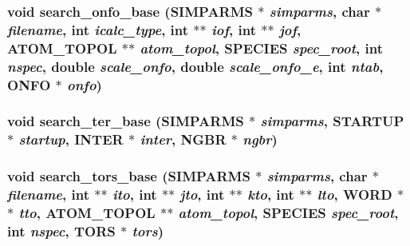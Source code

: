 \subsubsection{\setlength{\rightskip}{0pt plus 5cm}void search\_\-onfo\_\-base ({\bf SIMPARMS} $\ast$ {\em simparms}, char $\ast$ {\em filename}, int {\em icalc\_\-type}, int $\ast$$\ast$ {\em iof}, int $\ast$$\ast$ {\em jof}, {\bf ATOM\_\-TOPOL} $\ast$$\ast$ {\em atom\_\-topol}, {\bf SPECIES} {\em spec\_\-root}, int {\em nspec}, double {\em scale\_\-onfo}, double {\em scale\_\-onfo\_\-e}, int {\em ntab}, {\bf ONFO} $\ast$ {\em onfo})}\label{input_2md__searchbase_8c_30fa11c71e4dc2c749545bdaf66091bf}


\subsubsection{\setlength{\rightskip}{0pt plus 5cm}void search\_\-ter\_\-base ({\bf SIMPARMS} $\ast$ {\em simparms}, {\bf STARTUP} $\ast$ {\em startup}, {\bf INTER} $\ast$ {\em inter}, {\bf NGBR} $\ast$ {\em ngbr})}\label{input_2md__searchbase_8c_ff6edcbad927b3d8364b885473875dd0}


\subsubsection{\setlength{\rightskip}{0pt plus 5cm}void search\_\-tors\_\-base ({\bf SIMPARMS} $\ast$ {\em simparms}, char $\ast$ {\em filename}, int $\ast$$\ast$ {\em ito}, int $\ast$$\ast$ {\em jto}, int $\ast$$\ast$ {\em kto}, int $\ast$$\ast$ {\em lto}, {\bf WORD} $\ast$$\ast$ {\em tto}, {\bf ATOM\_\-TOPOL} $\ast$$\ast$ {\em atom\_\-topol}, {\bf SPECIES} {\em spec\_\-root}, int {\em nspec}, {\bf TORS} $\ast$ {\em tors})}\label{input_2md__searchbase_8c_ed95e7a631fddf47882560d88bac50e6}


